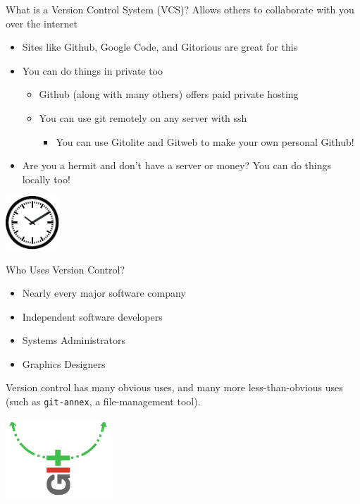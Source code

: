 \documentclass[aspectratio=43]{beamer}
\begin{document}
\begin{frame}{What is a Version Control System (VCS)?}
    Allows others to collaborate with you over the internet
    \begin{itemize}
    \item Sites like Github, Google Code, and Gitorious are great for this
    \item You can do things in private too
        \begin{itemize}
        \item Github (along with many others) offers paid private hosting
        \item You can use git remotely on any server with ssh
            \begin{itemize}
            \item You can use Gitolite and Gitweb to make your own personal
                Github!
            \end{itemize}
        \end{itemize}
    \item Are you a hermit and don't have a server or money? You can do things
        locally too!
    \end{itemize}
    \begin{flushright}
        \includegraphics[height=2cm]{resources/time_clock.pdf}
    \end{flushright}
\end{frame}

\begin{frame}{Who Uses Version Control?}
    \begin{itemize}
    \item Nearly every major software company
    \item Independent software developers
    \item Systems Administrators
    \item Graphics Designers
    \end{itemize}
    Version control has many obvious uses, and many more less-than-obvious uses
    (such as \texttt{git-annex}, a file-management tool).
    \begin{center}
        \includegraphics[height=3cm]{resources/git_annex.pdf}
    \end{center}
\end{frame}
\end{document}
